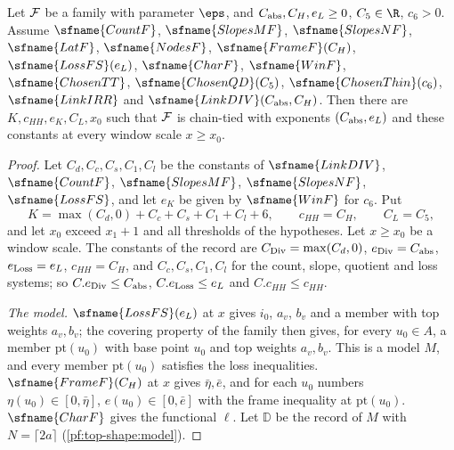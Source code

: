 \begin{theorem}\label{pf:top-shape:core}
Let $\mathcal{F}$ be a family with parameter $\eps$, and $C_{\rm abs},C_H,e_L\ge0$, $C_5\in\R$, $c_6>0$. Assume
$\sfname{CountF}$, $\sfname{SlopesMF}$, $\sfname{SlopesNF}$, $\sfname{LatF}$, $\sfname{NodesF}$, $\sfname{FrameF}(C_H)$,
$\sfname{LossFS}(e_L)$, $\sfname{CharF}$, $\sfname{WinF}$, $\sfname{ChosenTT}$, $\sfname{ChosenQD}(C_5)$,
$\sfname{ChosenThin}(c_6)$, $\sfname{LinkIRR}$ and $\sfname{LinkDIV}(C_{\rm abs},C_H)$. Then there are
$K,c_{HH},e_K,C_L,x_0$ such that $\mathcal{F}$ is chain-tied with exponents $(C_{\rm abs},e_L)$ and these constants at
every window scale $x\ge x_0$.
\end{theorem}

\begin{proof}
Let $C_d,C_c,C_s,C_1,C_l$ be the constants of $\sfname{LinkDIV}$, $\sfname{CountF}$, $\sfname{SlopesMF}$,
$\sfname{SlopesNF}$, $\sfname{LossFS}$, and let $e_K$ be given by $\sfname{WinF}$ for $c_6$. Put
\[
K=\max(C_d,0)+C_c+C_s+C_1+C_l+6,\qquad c_{HH}=C_H,\qquad C_L=C_5,
\]
and let $x_0$ exceed $x_1+1$ and all thresholds of the hypotheses. Let $x\ge x_0$ be a window scale. The constants of
the record are $C_{\rm Div}=\max(C_d,0)$, $e_{\rm Div}=C_{\rm abs}$, $e_{\rm Loss}=e_L$, $c_{HH}=C_H$, and $C_c,C_s,C_1,C_l$
for the count, slope, quotient and loss systems; so $C.e_{\rm Div}\le C_{\rm abs}$, $C.e_{\rm Loss}\le e_L$ and
$C.c_{HH}\le c_{HH}$.

\emph{The model.} $\sfname{LossFS}(e_L)$ at $x$ gives $i_0$, $a_v$, $b_v$ and a member with top weights $a_v,b_v$; the
covering property of the family then gives, for every $u_0\in A$, a member $\mathrm{pt}(u_0)$ with base point $u_0$ and
top weights $a_v,b_v$. This is a model $M$, and every member $\mathrm{pt}(u_0)$ satisfies the loss inequalities.
$\sfname{FrameF}(C_H)$ at $x$ gives $\bar\eta,\bar e$, and for each $u_0$ numbers $\eta(u_0)\in[0,\bar\eta]$,
$e(u_0)\in[0,\bar e]$ with the frame inequality at $\mathrm{pt}(u_0)$. $\sfname{CharF}$ gives the functional $\ell$. Let
$\mathbb D$ be the record of $M$ with $N=\lceil2a\rceil$ (\cref{pf:top-shape:model}).


\end{proof}
